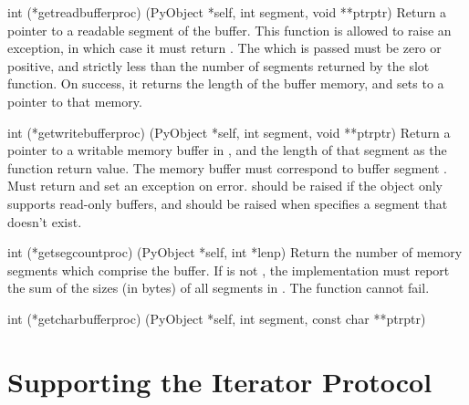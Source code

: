 \documentclass{manual}
\begin{document}
\begin{ctypedesc}[getreadbufferproc]{int (*getreadbufferproc)
                            (PyObject *self, int segment, void **ptrptr)}
Return a pointer to a readable segment of the buffer.  This function
is allowed to raise an exception, in which case it must return
.  The  which is passed must be zero or
positive, and strictly less than the number of segments returned by
the  slot function.  On success, it returns the
length of the buffer memory, and sets  to a
pointer to that memory.
\end{ctypedesc}

\begin{ctypedesc}[getwritebufferproc]{int (*getwritebufferproc)
                            (PyObject *self, int segment, void **ptrptr)}
Return a pointer to a writable memory buffer in ,
and the length of that segment as the function return value.
The memory buffer must correspond to buffer segment .
Must return  and set an exception on error.
 should be raised if the object only supports
read-only buffers, and  should be raised when
 specifies a segment that doesn't exist.
\end{ctypedesc}

\begin{ctypedesc}[getsegcountproc]{int (*getsegcountproc)
                            (PyObject *self, int *lenp)}
Return the number of memory segments which comprise the buffer.  If
 is not \NULL, the implementation must report the sum of the 
sizes (in bytes) of all segments in .
The function cannot fail.
\end{ctypedesc}

\begin{ctypedesc}[getcharbufferproc]{int (*getcharbufferproc)
                            (PyObject *self, int segment, const char **ptrptr)}
\end{ctypedesc}


\section{Supporting the Iterator Protocol
         \label{supporting-iteration}}
\end{document}
